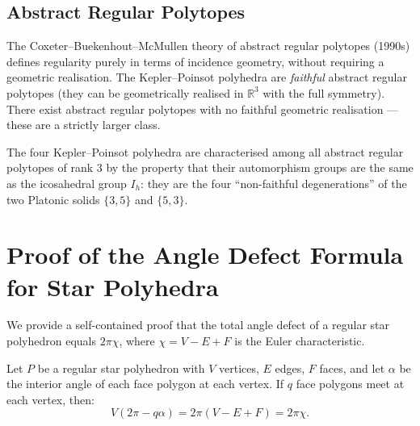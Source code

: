 \subsection{Abstract Regular Polytopes}
\label{ssec:abstract-polytopes}

The Coxeter–Buekenhout–McMullen theory of abstract regular
polytopes (1990s) defines regularity purely in terms of
incidence geometry, without requiring a geometric realisation.
The Kepler–Poinsot polyhedra are \emph{faithful} abstract
regular polytopes (they can be geometrically realised in
$\mathbb{R}^3$ with the full symmetry).  There exist abstract
regular polytopes with no faithful geometric realisation —
these are a strictly larger class.

The four Kepler–Poinsot polyhedra are characterised among all
abstract regular polytopes of rank 3 by the property that their
automorphism groups are the same as the icosahedral group
$I_h$: they are the four ``non-faithful degenerations'' of the
two Platonic solids $\{3,5\}$ and $\{5,3\}$.

\section{Proof of the Angle Defect Formula for Star Polyhedra}
\label{sec:angle-defect-proof}

We provide a self-contained proof that the total angle defect
of a regular star polyhedron equals $2\pi\chi$, where
$\chi = V - E + F$ is the Euler characteristic.

\begin{theorem}
\label{thm:descartes-euler-star}
Let $P$ be a regular star polyhedron with $V$ vertices, $E$
edges, $F$ faces, and let $\alpha$ be the interior angle of
each face polygon at each vertex.  If $q$ face polygons meet at
each vertex, then:
\[
  V(2\pi - q\alpha) = 2\pi(V - E + F) = 2\pi\chi.
\]
\end{theorem}

